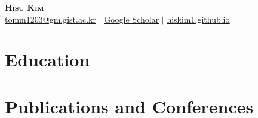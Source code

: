 \begin{center}
\textbf{\Huge \scshape Hisu Kim} \\ \vspace{3pt}
\href{mailto:tomm1203@gm.gist.ac.kr}{\underline{tomm1203@gm.gist.ac.kr}} $|$ \href{https://scholar.google.com/citations?user=4z2u1DIAAAAJ}{\underline{Google Scholar}} $|$ \href{https://hiskim1.github.io/}{\underline{hiskim1.github.io}}\\
\end{center}

\section{Education}


\section{Publications and Conferences}


